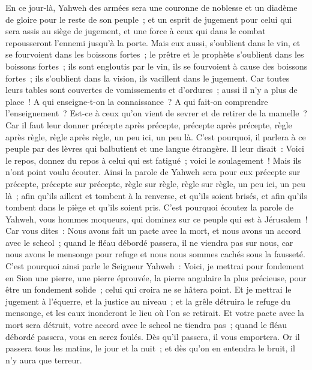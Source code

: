 \begin{multicols}{2}
En ce jour-là, Yahweh des armées sera une couronne de noblesse et un diadème de gloire pour le reste de son peuple~;
et un esprit de jugement pour celui qui sera assis au siège de jugement, et une force à ceux qui dans le combat repousseront l'ennemi jusqu'à la porte.
Mais eux aussi, s'oublient dans le vin, et se fourvoient dans les boissons fortes~; le prêtre et le prophète s'oublient dans les boissons fortes~; ils sont engloutis par le vin, ils se fourvoient à cause des boissons fortes~; ils s'oublient dans la vision, ils vacillent dans le jugement.
Car toutes leurs tables sont couvertes de vomissements et d'ordures~; aussi il n'y a plus de place~!
A qui enseigne-t-on la connaissance~? A qui fait-on comprendre l'enseignement~? Est-ce à ceux qu'on vient de sevrer et de retirer de la mamelle~?
Car il faut leur donner précepte après précepte, précepte après précepte, règle après règle, règle après règle, un peu ici, un peu là.
C'est pourquoi, il parlera à ce peuple par des lèvres qui balbutient et une langue étrangère.
Il leur disait~: Voici le repos, donnez du repos à celui qui est fatigué~; voici le soulagement~! Mais ils n'ont point voulu écouter.
Ainsi la parole de Yahweh sera pour eux précepte sur précepte, précepte sur précepte, règle sur règle, règle sur règle, un peu ici, un peu là~; afin qu'ils aillent et tombent à la renverse, et qu'ils soient brisés, et afin qu'ils tombent dans le piège et qu'ils soient pris.
C'est pourquoi écoutez la parole de Yahweh, vous hommes moqueurs, qui dominez sur ce peuple qui est à Jérusalem~!
Car vous dites~: Nous avons fait un pacte avec la mort, et nous avons un accord avec le scheol~; quand le fléau débordé passera, il ne viendra pas sur nous, car nous avons le mensonge pour refuge et nous nous sommes cachés sous la fausseté.
C'est pourquoi ainsi parle le Seigneur Yahweh~: Voici, je mettrai pour fondement en Sion une pierre, une pierre éprouvée, la pierre angulaire la plus précieuse, pour être un fondement solide~; celui qui croira ne se hâtera point.
Et je mettrai le jugement à l'équerre, et la justice au niveau~; et la grêle détruira le refuge du mensonge, et les eaux inonderont le lieu où l'on se retirait.
Et votre pacte avec la mort sera détruit, votre accord avec le scheol ne tiendra pas~; quand le fléau débordé passera, vous en serez foulés.
Dès qu'il passera, il vous emportera. Or il passera tous les matins, le jour et la nuit~; et dès qu'on en entendra le bruit, il n'y aura que terreur.

\end{multicols}
